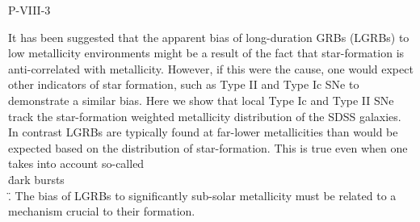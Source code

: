 P-VIII-3


\bigskip



\bigskip

\noindent It has been suggested that the apparent bias of long-duration GRBs (LGRBs) to low metallicity environments might be a result of the fact that star-formation is anti-correlated with metallicity.   However, if this were the cause, one would expect other indicators of star formation, such as Type II and Type Ic SNe to demonstrate a similar bias.  Here we show that local Type Ic and Type II SNe track the star-formation weighted metallicity distribution of the SDSS galaxies.  In contrast LGRBs are typically found at far-lower metallicities than would be expected based on the distribution of star-formation.   This is true even when one takes into account so-called \\\"dark bursts\\\".  The bias of LGRBs to significantly sub-solar metallicity must be related to a mechanism crucial to their formation.

